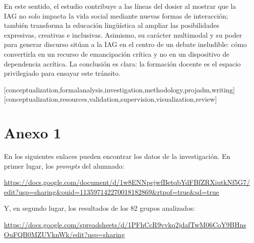 \documentclass[spanish]{textolivre}
\begin{document}
En este sentido, el estudio contribuye a las líneas del dosier al mostrar que la IAG no solo impacta la vida social mediante nuevas formas de interacción; también transforma la educación lingüística al ampliar las posibilidades expresivas, creativas e inclusivas. Asimismo, su carácter multimodal y su poder para generar discurso sitúan a la IAG en el centro de un debate ineludible: cómo convertirla en un recurso de emancipación crítica y no en un dispositivo de dependencia acrítica. La conclusión es clara: la formación docente es el espacio privilegiado para ensayar este tránsito.

\printbibliography\label{sec-bib}


\begin{contributors}
[conceptualization,formalanalysis,investigation,methodology,projadm,writing]
[conceptualization,resources,validation,supervision,visualization,review]
\end{contributors}

\begin{dataavailability}
\end{dataavailability}

\appendix 
\section{Anexo 1}\label{apx-longtable}
En los siguientes enlaces pueden encontrar los datos de la investigación. En primer lugar, los \textit{prompts} del alumnado:

\url{https://docs.google.com/document/d/1w8ENNpejwfBetqbYdFBfZRXiutkNf5G7/edit?usp=sharing&ouid=113597142270018182869&rtpof=true&sd=true}

Y, en segundo lugar, los resultados de los 82 grupos analizados:

\url{https://docs.google.com/spreadsheets/d/1PFhCcR9vvkq2jdafTwM06CoY9BHnsOuFQB0MZUVknWk/edit?usp=sharing}
\end{document}
